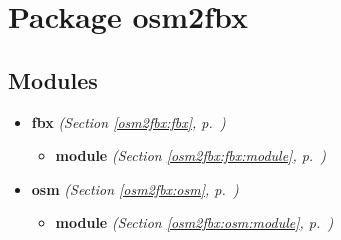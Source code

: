 %
%
%


\section{Package osm2fbx}

    \label{osm2fbx}


\subsection{Modules}

\begin{itemize}
\setlength{\parskip}{0ex}
\item \textbf{fbx}
  \textit{(Section \ref{osm2fbx:fbx}, p.~\pageref{osm2fbx:fbx})}

  \begin{itemize}
\setlength{\parskip}{0ex}
    \item \textbf{module}
  \textit{(Section \ref{osm2fbx:fbx:module}, p.~\pageref{osm2fbx:fbx:module})}

  \end{itemize}
\item \textbf{osm}
  \textit{(Section \ref{osm2fbx:osm}, p.~\pageref{osm2fbx:osm})}

  \begin{itemize}
\setlength{\parskip}{0ex}
    \item \textbf{module}
  \textit{(Section \ref{osm2fbx:osm:module}, p.~\pageref{osm2fbx:osm:module})}

  \end{itemize}
\end{itemize}



